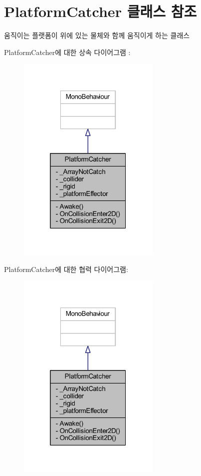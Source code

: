 \hypertarget{class_platform_catcher}{}\section{Platform\+Catcher 클래스 참조}
\label{class_platform_catcher}


움직이는 플랫폼이 위에 있는 물체와 함께 움직이게 하는 클래스  




Platform\+Catcher에 대한 상속 다이어그램 \+: \nopagebreak
\begin{figure}[H]
\begin{center}
\leavevmode
\includegraphics[width=193pt]{df/d0a/class_platform_catcher__inherit__graph}
\end{center}
\end{figure}


Platform\+Catcher에 대한 협력 다이어그램\+:\nopagebreak
\begin{figure}[H]
\begin{center}
\leavevmode
\includegraphics[width=193pt]{dc/db1/class_platform_catcher__coll__graph}
\end{center}
\end{figure}
